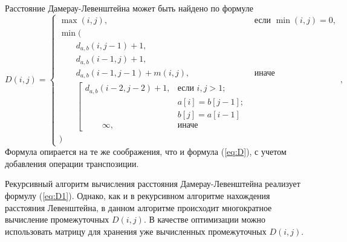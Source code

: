 Расстояние Дамерау-Левенштейна может быть найдено по формуле
\clearpage
\begin{equation}
	\label{eq:D1}
	D(i, j) = \begin{cases}
		\max(i, j), &\text{если }\min(i, j) = 0,\\
		\min ( \\
		\qquad d_{a,b}(i, j-1) + 1,\\
		\qquad d_{a,b}(i-1, j) + 1,\\
		\qquad d_{a,b}(i-1, j-1) + m(i, j), &\text{иначе}\\
		\qquad \left[ \begin{array}{cc}d_{a,b}(i-2, j-2) + 1, &\text{если }i,j > 1;\\
			\qquad &\text{}a[i] = b[j-1]; \\
			\qquad &\text{}b[j] = a[i-1]\\
			\qquad \infty, & \text{иначе}\end{array}\right.\\
		)
	\end{cases},
\end{equation}
Формула опирается на те же соображения, что и формула  (\ref{eq:D}), с учетом добавления операции транспозиции.

Рекурсивный алгоритм вычисления расстояния Дамерау-Левенштейна реализует формулу (\ref{eq:D1}).
Однако, как и в рекурсивном алгоритме нахождения расстояния Левенштейна, в данном алгоритме происходит многократное вычисление промежуточных $D(i, j)$.
В качестве оптимизации можно использовать матрицу для хранения уже вычисленных промежуточных $D(i, j)$.

